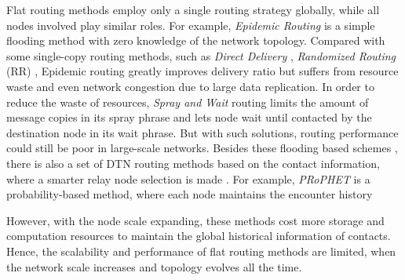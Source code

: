 \documentclass[conference]{IEEEtran}
\begin{document}
Flat routing methods employ only a single routing strategy globally, while all nodes involved play similar roles. For example,
\emph{Epidemic Routing} \cite{VahdatBecker-779} is a simple flooding method with zero knowledge of the network topology.  Compared with some single-copy routing methods, such as \emph{Direct Delivery} \cite{BalasubramanianLevine-489}, \emph{Randomized Routing} (RR) \cite{LeightonMaggs-780},  Epidemic routing greatly improves delivery ratio but suffers from resource waste and even network congestion due to large data replication. In order to reduce the waste of resources, \emph{Spray and Wait} routing \cite{SpyropoulosPsounis-772} limits the amount of message copies in its spray phrase and lets node wait until contacted by the destination node in its wait phrase. But with such solutions, routing performance could still be poor in large-scale networks.
Besides these flooding based schemes \cite{VahdatBecker-779,GrossglauserTse-777,SpyropoulosPsounis-778},
there is also a set of DTN routing methods based on the contact information, where a smarter relay node selection is made \cite{LindgrenDoria-782,BurgessGallagher-783}.
For example, \emph{PRoPHET}  is a probability-based method, where each node maintains the encounter history 

However, with the node scale expanding, these methods cost more storage and computation resources to maintain the global historical information of contacts. Hence, the scalability and performance of flat routing methods are limited, when the network scale increases and topology evolves all the time. 
\end{document}
